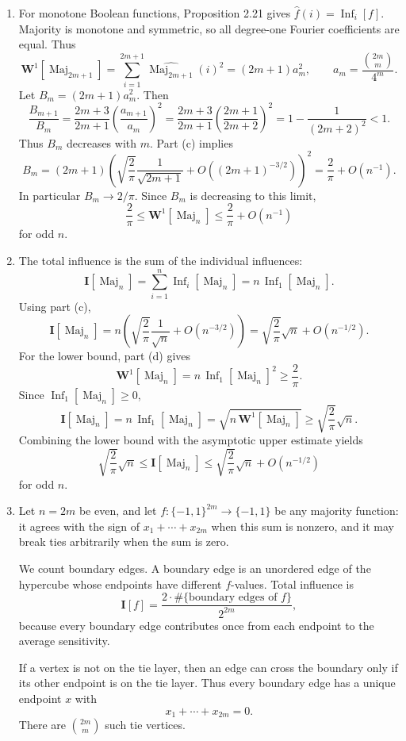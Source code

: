 \documentclass[11pt]{article}
\newcommand{\Inf}{\operatorname{Inf}}
\newcommand{\Maj}{\operatorname{Maj}}
\newcommand{\I}{\mathbf I}
\newcommand{\Wone}{\mathbf W^{1}}
\begin{document}
\begin{enumerate}[label=\textbf{(\alph*)}]
\item
For monotone Boolean functions, Proposition 2.21 gives
$\widehat f(i)=\Inf_i[f]$.  Majority is monotone and symmetric, so all
degree-one Fourier coefficients are equal.  Thus
\[
  \Wone[\Maj_{2m+1}]
    =
  \sum_{i=1}^{2m+1}\widehat{\Maj_{2m+1}}(i)^2
    =
  (2m+1)a_m^2,
  \qquad
  a_m=\frac{\binom{2m}{m}}{4^m}.
\]
Let $B_m=(2m+1)a_m^2$.  Then
\[
  \frac{B_{m+1}}{B_m}
    =
  \frac{2m+3}{2m+1}
  \left(\frac{a_{m+1}}{a_m}\right)^2
    =
  \frac{2m+3}{2m+1}
  \left(\frac{2m+1}{2m+2}\right)^2
    =
  1-\frac{1}{(2m+2)^2}
    <1.
\]
Thus $B_m$ decreases with $m$.  Part (c) implies
\[
  B_m
    =
  (2m+1)
  \left(
    \sqrt{\frac{2}{\pi}}\frac{1}{\sqrt{2m+1}}
    +O((2m+1)^{-3/2})
  \right)^2
    =
  \frac{2}{\pi}+O(n^{-1}).
\]
In particular $B_m\to 2/\pi$.  Since $B_m$ is decreasing to this limit,
\[
  \frac{2}{\pi}
    \le
  \Wone[\Maj_n]
    \le
  \frac{2}{\pi}+O(n^{-1})
\]
for odd $n$.

\item
The total influence is the sum of the individual influences:
\[
  \I[\Maj_n]
    =
  \sum_{i=1}^n \Inf_i[\Maj_n]
    =
  n\,\Inf_1[\Maj_n].
\]
Using part (c),
\[
  \I[\Maj_n]
    =
  n\left(
    \sqrt{\frac{2}{\pi}}\frac{1}{\sqrt n}
    +O(n^{-3/2})
  \right)
    =
  \sqrt{\frac{2}{\pi}}\sqrt n+O(n^{-1/2}).
\]
For the lower bound, part (d) gives
\[
  \Wone[\Maj_n]
    =
  n\,\Inf_1[\Maj_n]^2
    \ge
  \frac{2}{\pi}.
\]
Since $\Inf_1[\Maj_n]\ge 0$,
\[
  \I[\Maj_n]
    =
  n\,\Inf_1[\Maj_n]
    =
  \sqrt{n\,\Wone[\Maj_n]}
    \ge
  \sqrt{\frac{2}{\pi}}\sqrt n.
\]
Combining the lower bound with the asymptotic upper estimate yields
\[
  \sqrt{\frac{2}{\pi}}\sqrt n
    \le
  \I[\Maj_n]
    \le
  \sqrt{\frac{2}{\pi}}\sqrt n+O(n^{-1/2})
\]
for odd $n$.

\item
Let $n=2m$ be even, and let
$f:\{-1,1\}^{2m}\to\{-1,1\}$ be any majority function: it agrees with
the sign of $x_1+\cdots+x_{2m}$ when this sum is nonzero, and it may
break ties arbitrarily when the sum is zero.

We count boundary edges.  A boundary edge is an unordered edge of the
hypercube whose endpoints have different $f$-values.  Total influence is
\[
  \I[f]=\frac{2\cdot \#\{\text{boundary edges of } f\}}{2^{2m}},
\]
because every boundary edge contributes once from each endpoint to the
average sensitivity.

If a vertex is not on the tie layer, then an edge can cross the boundary
only if its other endpoint is on the tie layer.  Thus every boundary edge
has a unique endpoint $x$ with
\[
  x_1+\cdots+x_{2m}=0.
\]
There are $\binom{2m}{m}$ such tie vertices.


\end{enumerate}
\end{document}
